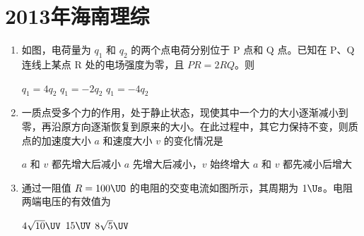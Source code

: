 \documentclass[\gkver]{gaokaozhenti}
\begin{document}
\chapter{2013年海南理综}

\begin{enumerate}
\item
如图，电荷量为 $q_1$ 和 $q_2$ 的两个点电荷分别位于 P 点和 Q 点。已知在 P、Q 连线上某点 R 处的电场强度为零，且 $PR=2RQ$。则


{$q_1=4q_2$}
{$q_1=-2q_2$}
{$q_1=-4q_2$}


\item
一质点受多个力的作用，处于静止状态，现使其中一个力的大小逐渐减小到零，再沿原方向逐渐恢复到原来的大小。在此过程中，其它力保持不变，则质点的加速度大小 $a$ 和速度大小 $v$ 的变化情况是

{$a$ 和 $v$ 都先增大后减小}
{$a$ 先增大后减小，$v$ 始终增大}
{$a$ 和 $v$ 都先减小后增大}


\item
通过一阻值 $R=100\UO$ 的电阻的交变电流如图所示，其周期为 $1\Us$。电阻两端电压的有效值为


\fourchoices[answer=B]
{$12\UV$}
{$4\sqrt{10}\UV$}
{$15\UV$}
{$8\sqrt{5}\UV$}



\end{enumerate}
\end{document}
